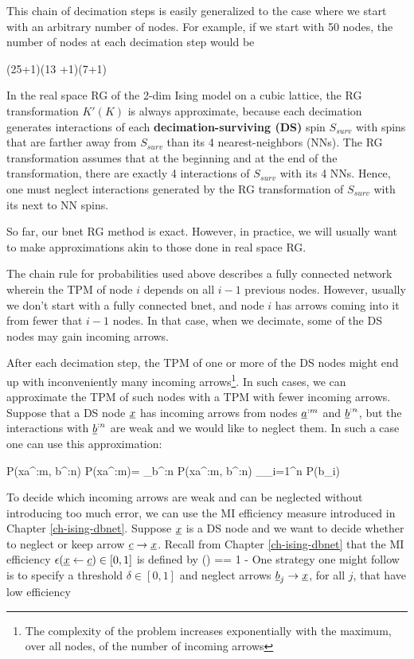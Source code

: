 This chain of decimation steps is
easily generalized to
the case where
we start with an arbitrary
number of nodes.
For example, if
we start with
50 nodes, the
number of nodes
at each decimation 
step would be

\rarrow (25+1)\rarrow (13 +1)\rarrow (7+1) 
\eeq


In the real space
RG of the 2-dim Ising model
on a cubic  lattice, the RG transformation
$K'(K)$
is always approximate,
because each decimation
generates interactions
of each {\bf decimation-surviving (DS)} spin $S_{surv}$
with spins that are farther 
away from $S_{surv}$ 
than its 
4 nearest-neighbors (NNs). 
The RG transformation 
assumes that at the 
beginning and at the end
of the transformation,
there are exactly 4 interactions of  $S_{surv}$
with its 4 NNs. 
Hence, one must
neglect interactions generated
by the RG transformation
of $S_{surv}$
with its next to NN spins.

So far, our bnet RG
method is exact.
However, in practice,
we will usually want to
make approximations akin 
to those done in real space RG.

The chain rule for 
probabilities used
above
describes 
a fully connected 
network wherein
the TPM of node
$i$
depends on all $i-1$
previous nodes. However,
usually
we don't start 
with a fully connected 
bnet,
and node $i$
has arrows coming into it
from fewer that 
$i-1$ nodes.
In that case, when
we decimate,
some of the DS nodes
may gain incoming arrows.

After each decimation step,
the TPM of one or more of the DS
nodes might end up 
with inconveniently many incoming arrows\footnote{The complexity
of the problem increases
exponentially
with the maximum, over all nodes, of the number of incoming arrows}.
In such cases, we 
can approximate
the TPM
of such nodes
with a TPM with
fewer incoming arrows.
Suppose that a DS
node $\rvx$ has 
incoming arrows
from
nodes $\rva^{:m}$ and  $\rvb^{:n}$,
but the 
interactions 
with $\rvb^{:n}$
are weak and we
would like to neglect
them. In such a case
one can use this
approximation:


\beq
P(x\mid a^{:m}, b^{:n})\rarrow
P(x\mid a^{:m})=
\sum_{b^{:n}}
P(x\mid a^{:m}, b^{:n})
_{\approx \prod_{i=1}^n P(b_i)}
\eeq

To decide
which
incoming arrows
are weak and can
be neglected
without
introducing 
too much error,
we can use the
MI efficiency measure
introduced in Chapter
\ref{ch-ising-dbnet}.
Suppose $\rvx$ is a DS
node and we 
want to decide whether
to neglect or keep 
arrow $\rvc\rarrow \rvx$.
Recall from Chapter \ref{ch-ising-dbnet}
 that the MI efficiency
$\eps(\rvx\larrow \rvc)\in [0,1]$
is defined by
\beq
\eps(\rvx\larrow \rvc)
==
1 -
\eeq
One strategy
one might 
follow is to
specify a 
threshold $\delta\in[0, 1]$
and neglect 
arrows $\rvb_j\rarrow \rvx$, 
for all $j$, that have low efficiency

